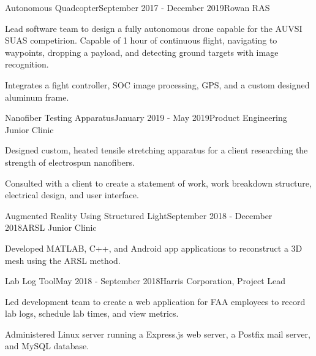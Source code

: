 {  %

  \begin{rSubsection}{Autonomous Quadcopter}{September 2017 - December 2019}{Rowan
    RAS}{}
  \item Lead software team to design a fully autonomous drone capable for the AUVSI SUAS competirion. Capable of 1
    hour of continuous flight, navigating to waypoints, dropping a
    payload, and detecting ground targets with image recognition.
  \item Integrates a fight controller, SOC image processing, GPS,
    and a custom designed aluminum frame.
  \end{rSubsection}


  \begin{rSubsection}{Nanofiber Testing Apparatus}{January 2019 - May 2019}{Product Engineering Junior Clinic}{}
  \item Designed custom, heated tensile stretching apparatus for a client researching the strength of electrospun nanofibers.
  \item Consulted with a client to create a statement of work, work breakdown structure, electrical design, and user interface.
  \end{rSubsection}


  \begin{rSubsection}{Augmented Reality Using Structured Light}{September
    2018 - December 2018}{ARSL Junior Clinic}{}
  \item Developed MATLAB, C++, and Android app applications to reconstruct a 3D mesh using the ARSL method.
  \end{rSubsection}


  \begin{rSubsection}{Lab Log Tool}{May 2018 - September 2018}{Harris Corporation, Project Lead}{}
  \item Led development team to create a web application for FAA employees to record lab logs, schedule lab times, and view metrics.
  \item Administered Linux server running a Express.js web server, a Postfix mail server, and MySQL database.
  \end{rSubsection}

  }

